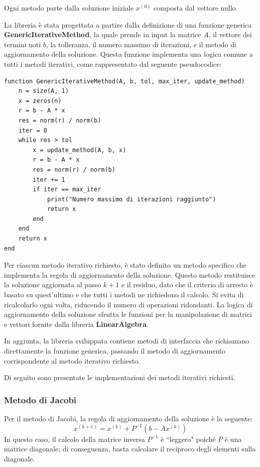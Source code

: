 Ogni metodo parte dalla soluzione iniziale $x^{(0)}$ composta dal vettore nullo. 

La libreria è stata progettata a partire dalla definizione di una funzione generica
\textbf{GenericIterativeMethod}, la quale prende in input la matrice $A$, il
vettore dei termini noti $b$, la tolleranza, il numero massimo di iterazioni, e
il metodo di aggiornamento della soluzione. Questa funzione implementa una logica
comune a tutti i metodi iterativi, come rappresentato dal seguente pseudocodice:
\begin{verbatim}
function GenericIterativeMethod(A, b, tol, max_iter, update_method)
    n = size(A, 1)
    x = zeros(n)
    r = b - A * x
    res = norm(r) / norm(b)
    iter = 0
    while res > tol
        x = update_method(A, b, x)
        r = b - A * x
        res = norm(r) / norm(b)
        iter += 1
        if iter == max_iter
            print("Numero massimo di iterazioni raggiunto")
            return x
        end
    end
    return x
end
\end{verbatim}

Per ciascun metodo iterativo richiesto, è stato definito un metodo specifico che
implementa la regola di aggiornamento della soluzione. Questo metodo restituisce
la soluzione aggiornata al passo $k+1$ e il residuo, dato che il criterio di
arresto è basato su quest'ultimo e che tutti i metodi ne richiedono il calcolo.
Si evita di ricalcolarlo ogni volta, riducendo il numero di operazioni ridondanti.
La logica di aggiornamento della soluzione sfrutta le funzioni per la manipolazione
di matrici e vettori fornite dalla libreria \textbf{LinearAlgebra}.

In aggiunta, la libreria sviluppata contiene metodi di interfaccia che richiamano
direttamente la funzione generica, passando il metodo di aggiornamento corrispondente
al metodo iterativo richiesto.

Di seguito sono presentate le implementazioni dei metodi iterativi richiesti.
\subsubsection{Metodo di Jacobi}
Per il metodo di Jacobi, la regola di aggiornamento della soluzione è la seguente:
\begin{equation}
    x^{(k+1)} = x^{(k)} + P^{-1}(b - Ax^{(k)})
\end{equation}
In questo caso, il calcolo della matrice inversa $P^{-1}$ è ``leggero" poiché $P$
è una matrice diagonale; di conseguenza, basta calcolare il reciproco degli
elementi sulla diagonale.

